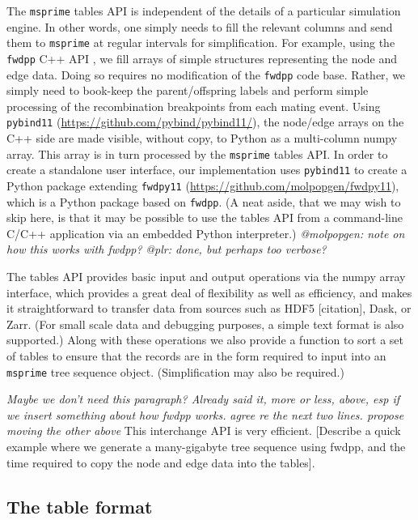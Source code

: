\documentclass{article}
\newcommand{\fwdpp}{\texttt{fwdpp}}
\newcommand{\msprime}{\texttt{msprime}}
\newcommand{\krt}[1]{{\em \color{green} #1}}
\newcommand{\plr}[1]{{\em \color{blue} #1}}
\newcommand{\jda}[1]{{\em \color{cyan} #1}}
\begin{document}
The \msprime{} tables API is independent of the details of a particular simulation engine.  In other words, one simply
needs to fill the relevant columns and send them to \msprime{} at regular intervals for simplification.  For example,
using the \fwdpp{} C++ API \cite{fwdpp}, we fill arrays of simple structures representing the node and edge data.
Doing so requires no modification of the \fwdpp{} code base.  Rather, we simply need to book-keep the parent/offspring
labels and perform simple processing of the recombination breakpoints from each mating event.  Using \texttt{pybind11}
(\url{https://github.com/pybind/pybind11/}),
the node/edge arrays on
the C++ side are made visible, without copy, to Python as a multi-column numpy array. This array is in turn processed by
the \msprime{} tables API.  In order to create a standalone user interface, our implementation uses \texttt{pybind11} to
create a Python package extending \texttt{fwdpy11} (\url{https://github.com/molpopgen/fwdpy11}), which is a Python
package based on \fwdpp{}.  (A neat aside, that we may wish to skip here, is that it may be possible to use the tables
API from a command-line C/C++ application via an embedded Python interpreter.)
\plr{@molpopgen: note on how this works with fwdpp?}
\krt{@plr: done, but perhaps too verbose?}

The tables API provides basic input and output operations via the numpy
array interface, which provides a great deal of flexibility as well
as efficiency, and makes it straightforward to transfer data from sources
such as HDF5 [citation], Dask, or Zarr.
(For small scale data and debugging purposes, a simple text format is also supported.)
Along with these operations we also provide a function to sort a set of tables
to ensure that the records are in the form required to input
into an \msprime{} tree sequence object. (Simplification may also be required.)

\plr{Maybe we don't need this paragraph? Already said it, more or less, above, esp if we insert something about how fwdpp works.}
\jda{agree re the next two lines. propose moving the other above}
This interchange API is very efficient. [Describe a quick example where we generate
a many-gigabyte tree sequence using fwdpp, and the time required
to copy the node and edge data into the tables].

\subsection*{The table format}
\end{document}
